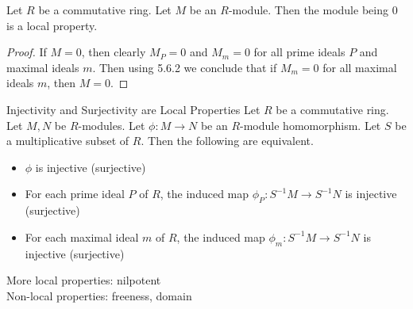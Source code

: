 \documentclass[a4paper]{article}
\begin{document}
\begin{lmm}{}{} Let $R$ be a commutative ring. Let $M$ be an $R$-module. Then the module being $0$ is a local property. \tcbline
\begin{proof}
If $M=0$, then clearly $M_P=0$ and $M_m=0$ for all prime ideals $P$ and maximal ideals $m$. Then using 5.6.2 we conclude that if $M_m=0$ for all maximal ideals $m$, then $M=0$. 
\end{proof}
\end{lmm}

\begin{prp}{Injectivity and Surjectivity are Local Properties}{} Let $R$ be a commutative ring. Let $M,N$ be $R$-modules. Let $\phi:M\to N$ be an $R$-module homomorphism. Let $S$ be a multiplicative subset of $R$. Then the following are equivalent. 
\begin{itemize}
\item $\phi$ is injective (surjective)
\item For each prime ideal $P$ of $R$, the induced map $\phi_P:S^{-1}M\to S^{-1}N$ is injective (surjective)
\item For each maximal ideal $m$ of $R$, the induced map $\phi_m:S^{-1}M\to S^{-1}N$ is injective (surjective)
\end{itemize}
\end{prp}

More local properties: nilpotent\\
Non-local properties: freeness, domain
\end{document}
